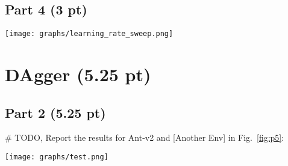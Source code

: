 \documentclass{article}
\newcommand{\fref}[1]{Fig.~\ref{#1}}
\begin{document}
\subsection{Part 4 (3 pt)}
\begin{figure*}[!h]
	\centering
\texttt{[image: graphs/learning\_rate\_sweep.png]}
	\caption{The graph shows mean return $\pm$ standard deviation of the BC Agent in Ant-v2 environment over approximately 5 rollouts for each learning rate value: 1e-4, 5e-4, 1e-3, 5e-3, 1e-2 and 5e-2.
  Rest of the hyperparameters are same as in 1.2.
  Learning rate was chosen because it controls the gradient step size and can impact both convergence speed and final performance, as can beseen from the graph.
  }
	\label{fig:p4}
\end{figure*}

\section{DAgger (5.25 pt)}
\subsection{Part 2 (5.25 pt)}
\# TODO, Report the results for Ant-v2 and [Another Env] in \fref{fig:p5}:
\begin{figure*}[!h]
	\centering
	\texttt{[image: graphs/test.png]}
	\caption{Learning curve, plotting the number of DAgger iterations vs. the policy’s mean return, with error bars to show the standard deviation. Please show the Ant-v2 environment results on the left and the results from [Another Env] on the right.}
	\label{fig:p5}
\end{figure*}
\end{document}
